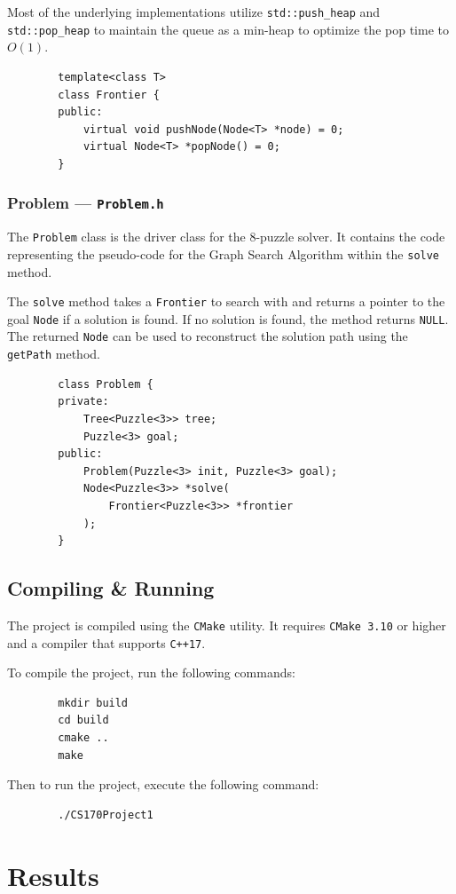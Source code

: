 \documentclass[12pt, english]{article}
\begin{document}
    Most of the underlying implementations utilize \lstinline|std::push_heap| and \lstinline|std::pop_heap|
    to maintain the queue as a min-heap to optimize the pop time to $O(1)$.

    \begin{lstlisting}
        template<class T>
        class Frontier {
        public:
            virtual void pushNode(Node<T> *node) = 0;
            virtual Node<T> *popNode() = 0;
        }
    \end{lstlisting}

    \subsubsection{Problem --- \texttt{Problem.h}}
    The \lstinline|Problem| class is the driver class for the 8-puzzle solver.
    It contains the code representing the pseudo-code for the Graph Search Algorithm
    within the \lstinline|solve| method.

    The \lstinline|solve| method takes a \lstinline|Frontier| to search with and returns
    a pointer to the goal \lstinline|Node| if a solution is found. If no solution is found,
    the method returns \lstinline|NULL|. The returned \lstinline|Node| can be used to
    reconstruct the solution path using the \lstinline|getPath| method.

    \begin{lstlisting}
        class Problem {
        private:
            Tree<Puzzle<3>> tree;
            Puzzle<3> goal;
        public:
            Problem(Puzzle<3> init, Puzzle<3> goal);
            Node<Puzzle<3>> *solve(
                Frontier<Puzzle<3>> *frontier
            );
        }
    \end{lstlisting}

    \subsection{Compiling \& Running}

    The project is compiled using the \texttt{CMake} utility.
    It requires \texttt{CMake 3.10} or higher and a compiler that supports \texttt{C++17}.

    To compile the project, run the following commands:
    \begin{lstlisting}
        mkdir build
        cd build
        cmake ..
        make
    \end{lstlisting}

    Then to run the project, execute the following command:
    \begin{lstlisting}
        ./CS170Project1
    \end{lstlisting}

    \section{Results}
\end{document}
